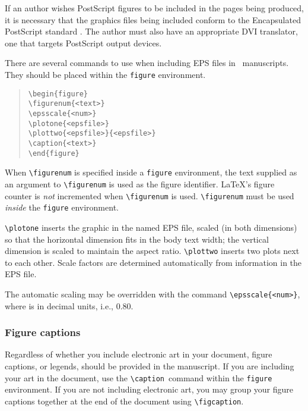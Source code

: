 \documentclass[preprint2]{aastex}
\begin{document}
If an author wishes PostScript figures to be included in the 
pages being produced, it is necessary that 
the graphics files being included conform 
to the Encapsulated PostScript standard \citep{PLRM}. The 
author must also have an appropriate DVI translator, 
one that targets PostScript output devices. 
 
There are several commands to use when including EPS files 
in \aastex\ manuscripts. They should be placed within  the 
 \texttt{figure} environment. 
\begin{quote} 
\begin{verbatim} 
\begin{figure} 
\figurenum{<text>} 
\epsscale{<num>} 
\plotone{<epsfile>} 
\plottwo{<epsfile>}{<epsfile>} 
\caption{<text>} 
\end{figure} 
\end{verbatim} 
\end{quote} 
When \verb"\figurenum" is specified inside a {\tt figure} environment, 
the text supplied as an argument to \verb"\figurenum" is used as the 
figure identifier. 
\LaTeX's figure counter is \emph{not} incremented when \verb"\figurenum" 
is used. 
\verb"\figurenum" must be used \emph{inside} the {\tt figure} environment. 
 
\verb"\plotone" inserts the graphic in the named EPS file, 
scaled (in both dimensions) so that the horizontal 
dimension fits in the body text width; 
the vertical dimension is scaled to maintain the aspect ratio. 
\verb"\plottwo" inserts two plots next to each other. 
Scale factors are determined automatically from information in the 
EPS file. 
 
The automatic scaling may be overridden with the command 
\verb"\epsscale{<num>}", where  
is in decimal units, i.e., 0.80. 
 
 
\subsubsection{Figure captions} \label{legends} 
 
Regardless of whether you include electronic art in your document, figure captions, or legends, should be provided in the manuscript. If you are including your art in the document, use the \verb"\caption"\ command within the \texttt{figure} environment.  If you are not including electronic art, you may group your figure captions together at the end of the document using \verb"\figcaption".
\end{document}
